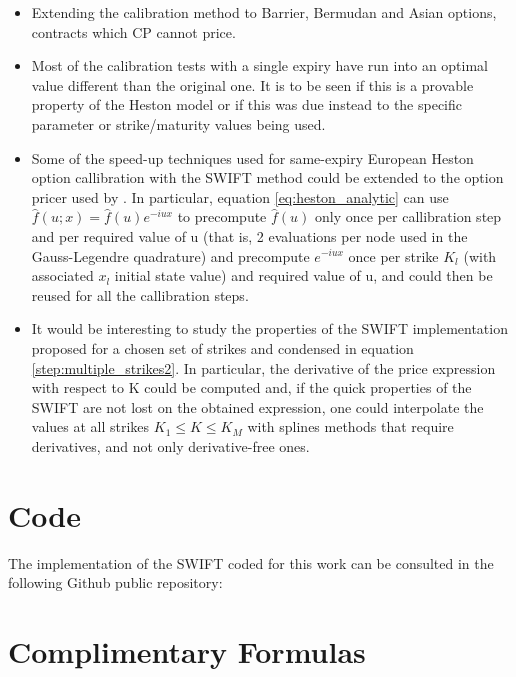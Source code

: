 \documentclass[12,twoside]{mammeTFM}
\theoremstyle{definition}
\theoremstyle{remark}
\begin{document}
\begin{itemize}

\item Extending the calibration method to Barrier, Bermudan and Asian options, contracts which CP cannot price.

\item Most of the calibration tests with a single expiry have run into an optimal value different than the original one. It is to be seen if this is a provable property of the Heston model or if this was due instead to the specific parameter or strike/maturity values being used.

\item Some of the speed-up techniques used for same-expiry European Heston option callibration with the SWIFT method could be extended to the option pricer used by \cite{cui17}. In particular, equation \ref{eq:heston_analytic} can use $\hat{f}(u; x) = \hat{f}(u) e^{-i u x}$ to precompute $\hat{f}(u)$ only once per callibration step and per required value of u (that is, 2 evaluations per node used in the Gauss-Legendre quadrature) and precompute $e^{-i u x}$ once per strike $K_l$ (with associated $x_l$ initial state value) and required value of u, and could then be reused for all the callibration steps.

\item It would be interesting to study the properties of the SWIFT implementation proposed for a chosen set of strikes and condensed in equation \ref{step:multiple_strikes2}. In particular, the derivative of the price expression with respect to K could be computed and, if the quick properties of the SWIFT are not lost on the obtained expression, one could interpolate the values at all strikes $K_1 \leq K \leq K_M$ with splines methods that require derivatives, and not only derivative-free ones.

\end{itemize}

\newpage

{}


\appendix
\vfill\newpage 
\section{Code}
The implementation of the SWIFT coded for this work can be consulted in the following Github public repository:


\section{Complimentary Formulas}
\end{document}

